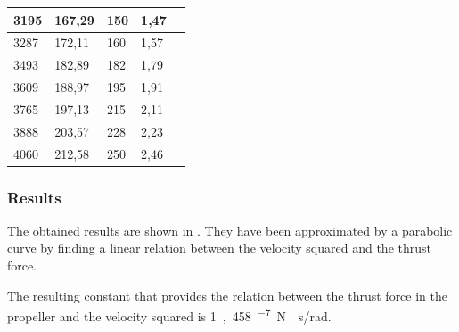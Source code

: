\begin{table}[H]
\begin{tabular}{|l|l|l|l|p{4.3cm}|}
		\hline%
		3195 						       &  167,29				           & 150                      & 1,47         \\
		\hline%
		3287                               &  172,11   			               & 160                      & 1,57         \\
		\hline%
		3493                               &  182,89                           & 182                      & 1,79         \\
		\hline%
		3609 					           &  188,97	                       & 195                      & 1,91         \\
		\hline%
		3765 						       &  197,13		                   & 215                      & 2,11         \\
		\hline%
		3888 						       &  203,57		                   & 228                      & 2,23         \\
		\hline%
		4060 						       &  212,58		                   & 250                      & 2,46         \\
		\hline%
				
	\end{tabular}
\end{table}
\subsubsection{Results}
The obtained results are shown in . They have been approximated by a parabolic curve by finding a linear relation between the velocity squared and the thrust force.


The resulting constant that provides the relation between the thrust force in the propeller and the velocity squared is \si{1,458^{-7} N\cdot s/rad}.
